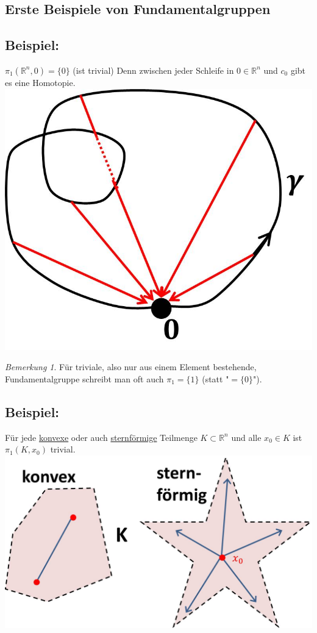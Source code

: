 \documentclass[a4paper,11pt,notitlepage]{report}
\theoremstyle{remark}
\newtheorem{remark}{Bemerkung}[chapter]
\theoremstyle{definition}
\newcommand{\R}{{\ensuremath{\mathbb{R}}}}
\newenvironment{bsp}[1]
{
\setlength{\fboxsep}{10pt}
\subsection*{Beispiel: #1}
\begin{upshape}
}
{
\end{upshape}
}
\begin{document}
\subsection{Erste Beispiele von Fundamentalgruppen}
\begin{bsp}{}
	$\pi_1(\R^n, 0) = \{0\}$ (ist trivial)
	\newline
	Denn zwischen jeder Schleife in $0 \in \R^n$ und $c_0$ gibt es eine Homotopie.
	\newline \includegraphics[scale=0.4]{images/Fundamentalgruppe_Rn.jpg}
\end{bsp}

\begin{remark}{}
	Für triviale, also nur aus einem Element bestehende, Fundamentalgruppe schreibt man oft auch $\pi_1 = \{1\}$ (statt "$=\{0\}$").
\end{remark}

\begin{bsp}{}
	Für jede \underline{konvexe} oder auch \underline{sternförmige} Teilmenge $K \subset \R^n$ und alle $x_0 \in K$ ist $\pi_1(K,x_0)$ trivial. \newline \includegraphics[scale=0.4]{images/konvex_sternfoermig.jpg}
\end{bsp}
\end{document}
